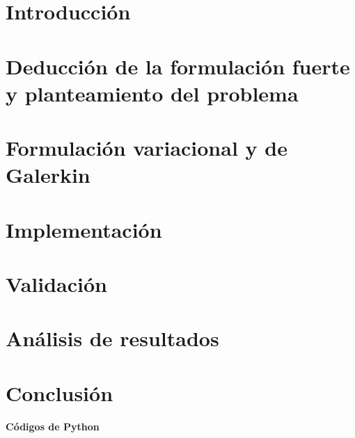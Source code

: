 \documentclass[10pt]{article}
\theoremstyle{definition}
\theoremstyle{remark}
\theoremstyle{definition}
\begin{document}
  \section{Introducci\'on}
    
  \section{Deducci\'on de la formulaci\'on fuerte y planteamiento del problema}
    
  \section{Formulaci\'on variacional y de Galerkin}
    
  \section{Implementaci\'on}
    
  \section{Validaci\'on}
    
  \section{An\'alisis de resultados}
    
  \section{Conclusi\'on}
    

  \pagebreak

  \twocolumn
  \begin{center}
	  {\bf C\'odigos de Python}
  \end{center}

  
%   
%   
%   
%   
%   
  
%   
  
\end{document}
